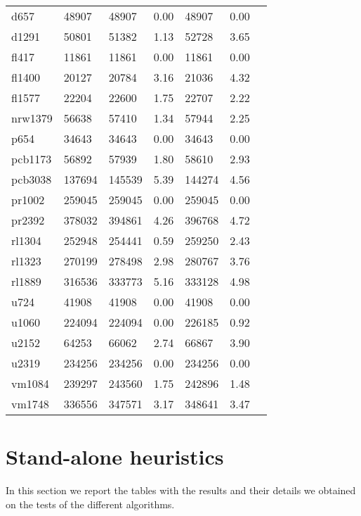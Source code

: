 \begin{center}
\begin{longtable}{lllllll}
			d657	 &	48907 & 48907    & 0.00	& 48907	& 0.00  \\
			d1291 &	50801 & 51382    & 1.13	& 52728	& 3.65  \\
			fl417 &	11861 & 11861    & 0.00	& 11861	& 0.00  \\
			fl1400 &	20127 & 20784   & 3.16	& 21036	& 4.32  \\
			fl1577 & 22204 & 22600   & 1.75	& 22707	& 2.22  \\
			nrw1379 & 56638 & 57410  & 1.34	& 57944	& 2.25  \\
			p654    & 34643 & 34643  & 0.00	& 34643	& 0.00  \\
			pcb1173 & 56892 & 57939  & 1.80	& 58610	& 2.93  \\
			pcb3038 & 137694 & 145539 & 5.39 & 144274 & 4.56  \\
			pr1002	& 259045 & 259045 & 0.00 & 259045 & 0.00  \\
			pr2392	& 378032 & 394861 & 4.26 & 396768 & 4.72  \\
			rl1304	& 252948 & 254441 & 0.59 & 259250 & 2.43  \\
			rl1323	& 270199 & 278498 & 2.98 & 280767 & 3.76  \\
			rl1889	& 316536 & 333773 & 5.16 & 333128 & 4.98  \\
			u724		& 41908 & 41908  & 0.00  & 41908 & 0.00  \\
			u1060	& 224094 & 224094 & 0.00 & 226185 & 0.92  \\
			u2152  	& 64253 & 66062	& 2.74	& 66867 & 3.90  \\
			u2319 	& 234256 & 234256	 & 0.00 & 234256 & 0.00  \\
			vm1084 	& 239297 & 243560	 & 1.75 & 242896 & 1.48  \\
			vm1748	& 336556 & 347571	 & 3.17 & 348641 & 3.47  \\

\end{longtable}
\end{center}


\newpage
\section{Stand-alone heuristics} 
\label{euristic_num_res}
In this section we report the tables with the results and their details we obtained on the tests of the different algorithms.\\

\setlength\LTleft{\fill}

